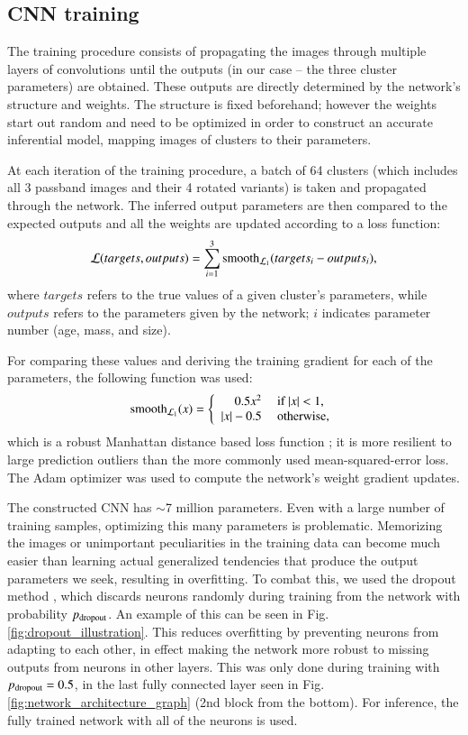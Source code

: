 \documentclass{aa}
\begin{document}
\subsection{CNN training} \label{training}
The training procedure consists of propagating the images through multiple layers of convolutions until the outputs (in our case -- the three cluster parameters) are obtained. These outputs are directly determined by the network's structure and weights. The structure is fixed beforehand; however the weights start out random and need to be optimized in order to construct an accurate inferential model, mapping images of clusters to their parameters.

At each iteration of the training procedure, a batch of 64 clusters (which includes all 3 passband images and their 4 rotated variants) is taken and propagated through the network. The inferred output parameters are then compared to the expected outputs and all the weights are updated according to a loss function:
\begin{equation}
\mathcal{L}(targets, outputs)=\sum_{i=1}^3 {\rm smooth_{\mathcal{L}_1}}(targets_i - outputs_i),
\end{equation}
where $targets$ refers to the true values of a given cluster's parameters, while $outputs$ refers to the parameters given by the network; $i$ indicates parameter number (age, mass, and size).

For comparing these values and deriving the training gradient for each of the parameters, the following function was used:
\begin{equation}{\rm smooth_{\mathcal{L}_1}}(x) = \left\{ \begin{array}{rl}
 0.5x^2 &\mbox{ if $|x|<1$,} \\
  |x|-0.5 &\mbox{ otherwise,}
       \end{array} \right.
\end{equation}
which is a robust Manhattan distance based loss function \citep{2015arXiv150408083G}; it is more resilient to large prediction outliers than the more commonly used mean-squared-error loss. The Adam optimizer \citep{2014arXiv1412.6980K} was used to compute the network's weight gradient updates.

The constructed CNN has $\sim$7 million parameters. Even with a large number of training samples, optimizing this many parameters is problematic. Memorizing the images or unimportant peculiarities in the training data can become much easier than learning actual generalized tendencies that produce the output parameters we seek, resulting in overfitting. To combat this, we used the dropout method \citep{dropout}, which discards neurons randomly during training from the network with probability $p_{\rm dropout}$. An example of this can be seen in Fig. \ref{fig:dropout_illustration}. This reduces overfitting by preventing neurons from adapting to each other, in effect making the network more robust to missing outputs from neurons in other layers. This was only done during training with $p_{\rm dropout}=0.5$, in the last fully connected layer seen in Fig. \ref{fig:network_architecture_graph} (2nd block from the bottom). For inference, the fully trained network with all of the neurons is used.
\end{document}
